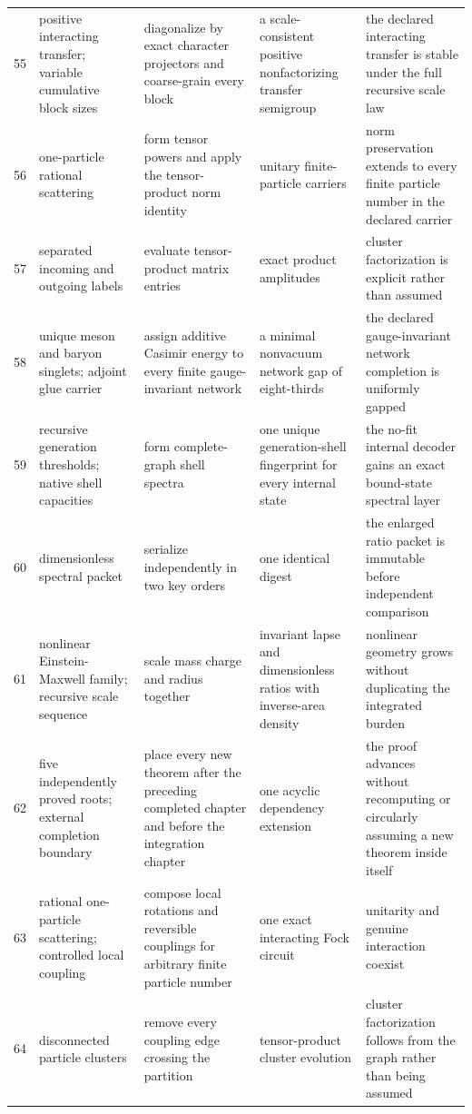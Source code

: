 \documentclass[11pt]{article}
\numberwithin{equation}{section}
\theoremstyle{remark}
\begin{document}
\begin{landscape}
\begin{longtable}{p{0.65cm}p{3.5cm}p{4.0cm}p{4.0cm}p{4.6cm}}
55&positive interacting transfer; variable cumulative block sizes&diagonalize by exact character projectors and coarse-grain every block&a scale-consistent positive nonfactorizing transfer semigroup&the declared interacting transfer is stable under the full recursive scale law\\
56&one-particle rational scattering&form tensor powers and apply the tensor-product norm identity&unitary finite-particle carriers&norm preservation extends to every finite particle number in the declared carrier\\
57&separated incoming and outgoing labels&evaluate tensor-product matrix entries&exact product amplitudes&cluster factorization is explicit rather than assumed\\
58&unique meson and baryon singlets; adjoint glue carrier&assign additive Casimir energy to every finite gauge-invariant network&a minimal nonvacuum network gap of eight-thirds&the declared gauge-invariant network completion is uniformly gapped\\
59&recursive generation thresholds; native shell capacities&form complete-graph shell spectra&one unique generation-shell fingerprint for every internal state&the no-fit internal decoder gains an exact bound-state spectral layer\\
60&dimensionless spectral packet&serialize independently in two key orders&one identical digest&the enlarged ratio packet is immutable before independent comparison\\
61&nonlinear Einstein-Maxwell family; recursive scale sequence&scale mass charge and radius together&invariant lapse and dimensionless ratios with inverse-area density&nonlinear geometry grows without duplicating the integrated burden\\
62&five independently proved roots; external completion boundary&place every new theorem after the preceding completed chapter and before the integration chapter&one acyclic dependency extension&the proof advances without recomputing or circularly assuming a new theorem inside itself\\
63&rational one-particle scattering; controlled local coupling&compose local rotations and reversible couplings for arbitrary finite particle number&one exact interacting Fock circuit&unitarity and genuine interaction coexist\\
64&disconnected particle clusters&remove every coupling edge crossing the partition&tensor-product cluster evolution&cluster factorization follows from the graph rather than being assumed\\

\end{longtable}
\end{landscape}
\end{document}
